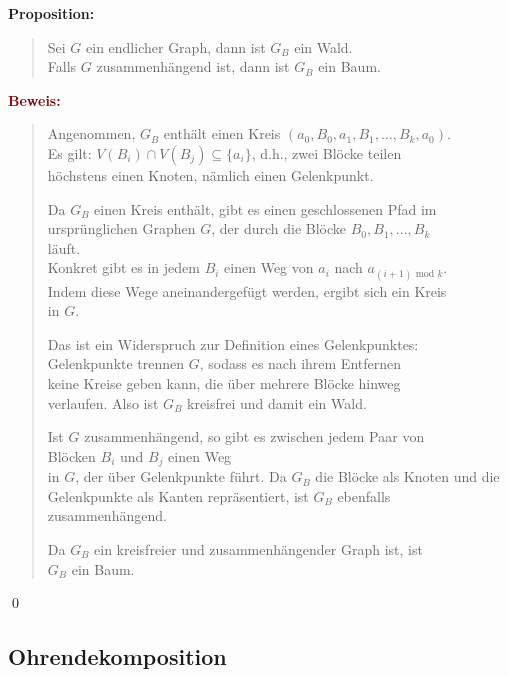 \documentclass{article}
\newcommand{\dgr}[1]{\textcolor{dgr}{#1}}
\newcommand{\maroon}[1]{\textcolor{maroon}{#1}}
\newcommand{\prop}[1]{\dgr{\textbf{Proposition: }}\begin{quote}#1\end{quote}}
\newcommand{\pr}[1]{\maroon{\textbf{Beweis: }}\begin{quote}#1\end{quote}\qed}
\renewcommand{\mod}{\text{ mod }}
\begin{document}
\newpage
\prop{
    Sei $G$ ein endlicher Graph, dann ist $G_B$ ein Wald.\\
    Falls $G$ zusammenhängend ist, dann ist $G_B$ ein Baum.
}
\pr{
    Angenommen, \(G_B\) enthält einen Kreis \((a_0, B_0, a_1, B_1, \dots, B_k, a_0)\).  \\
    Es gilt: \(V(B_i) \cap V(B_j) \subseteq \{a_i\}\), d.h., zwei Blöcke teilen\\
    höchstens einen Knoten, nämlich einen Gelenkpunkt.  

    Da \(G_B\) einen Kreis enthält, gibt es einen geschlossenen Pfad im\\
    ursprünglichen Graphen \(G\), der durch die Blöcke \(B_0, B_1, \dots, B_k\) \\läuft.\\
    Konkret gibt es in jedem \(B_i\) einen Weg von \(a_i\) nach \(a_{(i+1) \mod k}\).\\
    Indem diese Wege aneinandergefügt werden, ergibt sich ein Kreis \\
    in \(G\).  

    Das ist ein Widerspruch zur Definition eines Gelenkpunktes:\\
    Gelenkpunkte trennen \(G\), sodass es nach ihrem Entfernen\\
    keine Kreise geben kann, die über mehrere Blöcke hinweg\\
    verlaufen. Also ist \(G_B\) kreisfrei und damit ein Wald.  

    Ist \(G\) zusammenhängend, so gibt es zwischen jedem Paar von\\
    Blöcken \(B_i\) und \(B_j\) einen Weg\\
    in \(G\), der über Gelenkpunkte führt. Da \(G_B\) die Blöcke als Knoten und die Gelenkpunkte als Kanten repräsentiert, ist \(G_B\) ebenfalls zusammenhängend.  

    Da \(G_B\) ein kreisfreier und zusammenhängender Graph ist, ist \\
    \(G_B\) ein Baum. 
}

\subsection{Ohrendekomposition}
\end{document}
